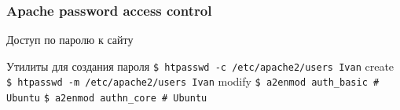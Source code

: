\begin{frame}[fragile]
        \frametitle{Apache password access control}

Доступ по паролю к сайту
 
Утилиты для создания пароля
\verb|$ htpasswd -c /etc/apache2/users Ivan| create
\verb|$ htpasswd -m /etc/apache2/users Ivan| modify
\verb|$ a2enmod auth_basic # Ubuntu|
\verb|$ a2enmod authn_core # Ubuntu|

\end{frame}
